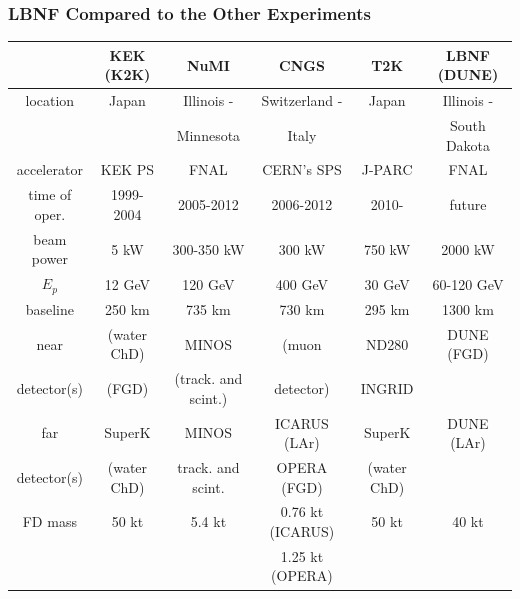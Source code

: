 \begin{frame}\frametitle{LBNF Compared to the Other Experiments \cite{ref_LBN_OscExpReview}}
\tiny
\centering
  \begin{tabular}{|c|c|c|c|c|c|}
              & KEK (K2K) & NuMI & CNGS & T2K & LBNF (DUNE)\\ \hline
     location & Japan  & Illinois - & Switzerland - & Japan & Illinois - \\ 
              &        & Minnesota & Italy &  & South Dakota\\ \hline
     accelerator & KEK PS  & FNAL & CERN's SPS & J-PARC & FNAL\\ \hline
     time of oper. & 1999-2004  & 2005-2012 & 2006-2012 & 2010- & future \\ \hline 
     beam power  &  5 kW  & 300-350 kW  & 300 kW & 750 kW & 2000 kW\\ \hline 
     $E_p$  & 12 GeV & 120 GeV & 400 GeV & 30 GeV & 60-120 GeV\\ \hline 
     baseline  & 250 km & 735 km & 730 km & 295 km & 1300 km\\ \hline 
     near        & (water ChD) & MINOS               & (muon               & ND280       & DUNE (FGD)\\  
     detector(s) & (FGD)       & (track. and scint.) & detector)           & INGRID      & \\ \hline 
     far         & SuperK      & MINOS               & ICARUS (LAr)        & SuperK      & DUNE (LAr)\\  
     detector(s) & (water ChD) & track. and scint.   & OPERA (FGD)        & (water ChD) & \\ \hline 
     FD mass     & 50 kt       & 5.4 kt              & 0.76 kt (ICARUS)   & 50 kt       & 40 kt\\ 
                 &             &                     & 1.25 kt (OPERA)    &             & \\ \hline 
 \end{tabular}
\end{frame}

